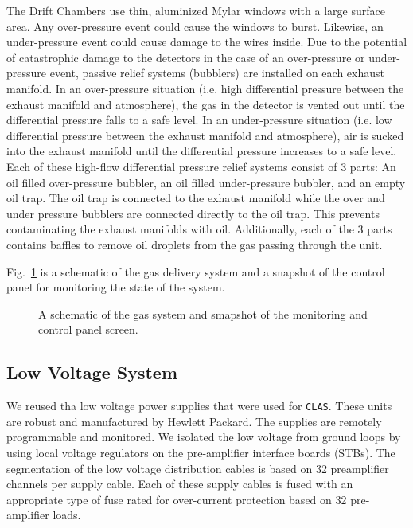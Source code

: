 The Drift Chambers use thin, aluminized Mylar windows with a large surface area.  
Any over-pressure event could cause the windows to burst. Likewise, an under-pressure 
event could cause damage to the wires inside.  Due to the potential of catastrophic 
damage to the detectors in the case of an over-pressure or under-pressure event, 
passive relief systems (bubblers) are installed on each exhaust manifold. In an 
over-pressure situation (i.e. high differential pressure between the exhaust manifold 
and atmosphere), the gas in the detector is vented out until the differential pressure 
falls to a safe level. In an under-pressure situation (i.e. low differential pressure 
between the exhaust manifold and atmosphere), air is sucked into the exhaust manifold 
until the differential pressure increases to a safe level. Each of these high-flow 
differential pressure relief systems consist of 3 parts:  An oil filled over-pressure 
bubbler, an oil filled under-pressure bubbler, and an empty oil trap. The oil trap is 
connected to the exhaust manifold while the over and under pressure bubblers are 
connected directly to the oil trap. This prevents contaminating the exhaust manifolds
with oil. Additionally, each of the 3 parts contains baffles to remove oil droplets 
from the gas passing through the unit. 

Fig.~\ref{dc-gas-system} is a schematic of the gas delivery system 
and a snapshot 
of the control panel for monitoring the state of the system.

\begin{figure}[htpb]   
\vspace{4.5cm}
\caption{\small{A schematic of the gas system and smapshot of the monitoring
and control panel screen.}}
\label{dc-gas-system}
\end{figure}   

 
\subsection{Low Voltage System}
We reused tha low voltage power supplies that were used for {\tt CLAS}.  
These units are robust and manufactured by Hewlett Packard.  
The supplies are remotely programmable and monitored.   We 
isolated the low voltage from 
ground loops by using local voltage regulators on the pre-amplifier interface 
boards (STBs).  The segmentation of the low voltage distribution cables is 
based on 32 preamplifier channels per supply cable.  Each of these supply 
cables is fused with an appropriate type of fuse rated for over-current 
protection based on 32 pre-amplifier loads.  

